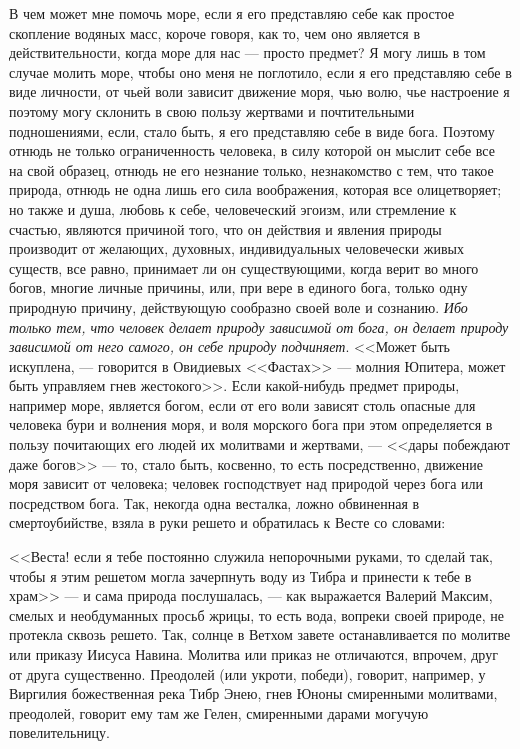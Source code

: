 \documentclass[12pt]{article}
\begin{document}
В чем может мне помочь море, если я его представляю себе как простое скопление водяных масс, короче говоря, как то, чем оно является в действительности, когда море для нас --- просто предмет? Я могу лишь в том случае молить море, чтобы оно меня не поглотило, если я его представляю себе в виде личности, от чьей воли зависит движение моря, чью волю, чье настроение я поэтому могу склонить в свою пользу жертвами и почтительными подношениями, если, стало быть, я его представляю себе в виде бога. Поэтому отнюдь не только ограниченность человека, в силу которой он мыслит себе все на свой образец, отнюдь не его незнание только, незнакомство с тем, что такое природа, отнюдь не одна лишь его сила воображения, которая все олицетворяет; но также и душа, любовь к себе, человеческий эгоизм, или стремление к счастью, являются причиной того, что он действия и явления природы производит от желающих, духовных, индивидуальных человечески живых существ, все равно, принимает ли он существующими, когда верит во много богов, многие личные причины, или, при вере в единого бога, только одну природную причину, действующую сообразно своей воле и сознанию. \emph{Ибо только тем, что человек делает природу зависимой от бога, он делает природу зависимой от него самого, он себе природу подчиняет}. <<Может быть искуплена, --- говорится в Овидиевых <<Фастах>>  --- молния Юпитера, может быть управляем гнев жестокого>>. Если какой-нибудь предмет природы, например море, является богом, если от его воли зависят столь опасные для человека бури и волнения моря, и воля морского бога при этом определяется в пользу почитающих его людей их молитвами и жертвами, --- <<дары побеждают даже богов>>  --- то, стало быть, косвенно, то есть посредственно, движение моря зависит от человека; человек господствует над природой через бога или посредством бога. Так, некогда одна весталка, ложно обвиненная в смертоубийстве, взяла в руки решето и обратилась к Весте со словами: 

<<Веста! если я тебе постоянно служила непорочными руками, то сделай так, чтобы я этим решетом могла зачерпнуть воду из Тибра и принести к тебе в храм>>  --- и сама природа послушалась, --- как выражается Валерий Максим, смелых и необдуманных просьб жрицы, то есть вода, вопреки своей природе, не протекла сквозь решето. Так, солнце в Ветхом завете останавливается по молитве или приказу Иисуса Навина. Молитва или приказ не отличаются, впрочем, друг от друга существенно. Преодолей (или укроти, победи), говорит, например, у Виргилия божественная река Тибр Энею, гнев Юноны смиренными молитвами, преодолей, говорит ему там же Гелен, смиренными дарами могучую повелительницу. 
\end{document}
